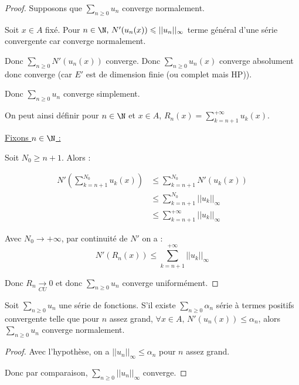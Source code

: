 \begin{proof}
    Supposons que $\displaystyle \sum_{n \geqslant 0} u_n$ converge normalement.

    Soit $x \in A$ fixé. Pour $n \in \N, \, N'(u_n(x)) \leqslant || u_n ||_{\infty}$ terme général 
    d'une série convergente car converge normalement. 

    Donc $\sum_{n \geqslant 0} N'(u_n(x))$ converge. Donc $\sum_{n \geqslant 0} u_n(x)$
    converge absolument donc converge (car $E'$ est de dimension finie (ou complet mais HP)). 

    Donc $\displaystyle \sum_{n \geqslant 0} u_n$ converge simplement.

    On peut ainsi définir pour $n \in \N$ et $x \in A$, $\displaystyle R_n(x) = \sum_{k = n + 1}^{ + \infty } u_k(x)$.

    \uline{Fixons $n \in \N$ :}

    Soit $N_0 \geqslant n + 1$. Alors :

    \begin{align}
        N'\left( \sum_{k = n + 1}^{N_0} u_k(x) \right) & \leqslant \sum_{k = n + 1}^{N_0} N'(u_k(x)) \\
        & \leqslant \sum_{k = n + 1}^{N_0} || u_k ||_{\infty} \\
        & \leqslant \sum_{k = n + 1}^{ + \infty } || u_k ||_{\infty}
    \end{align}

    Avec $N_0 \to + \infty$, par continuité de $N'$ on a : 
    \[N'(R_n(x)) \leqslant \sum_{k = n + 1}^{ + \infty } || u_k ||_{\infty}\]

    Donc $\displaystyle R_n \xrightarrow[CU]{} 0$ et donc $\displaystyle \sum_{n \geqslant 0} u_n$ converge uniformément.
\end{proof}

\begin{proposition}{}{}
    Soit $\sum_{n \geqslant 0} u_n$ une série de fonctions. S'il existe
    $\sum_{n \geqslant 0} \alpha_n$ série à termes positifs convergente telle que 
    pour $n$ assez grand, $\forall x \in A, \, N'(u_n(x)) \leqslant \alpha_n$, alors 
    $\sum_{n \geqslant 0} u_n$ converge normalement.
\end{proposition}


\begin{proof}
    Avec l'hypothèse, on a $||u_n||_\infty \leqslant \alpha_n$ pour $n$ assez grand. 

    Donc par comparaison, $\displaystyle \sum_{n \geqslant 0} || u_n ||_{\infty}$ converge.
\end{proof}

